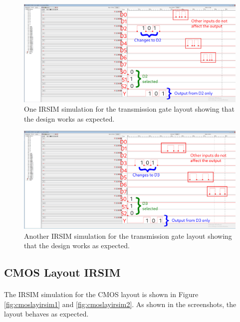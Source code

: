 \documentclass{article}
\begin{document}
    \begin{figure}[H]
      \centering
      \includegraphics[width=\linewidth, frame]{screenshots/tg/lay/irsim.png}
      \caption{One IRSIM simulation for the transmission gate layout showing that the design works as expected.}
      \label{fig:tglayirsim1}
    \end{figure}


    \begin{figure}[H]
      \centering
      \includegraphics[width=\linewidth, frame]{screenshots/tg/lay/irsim2.png}
      \caption{Another IRSIM simulation for the transmission gate layout showing that the design works as expected.}
      \label{fig:tglayirsim2}
    \end{figure}


  \subsection{CMOS Layout IRSIM}
    \paragraph{}
    The IRSIM simulation for the CMOS layout is shown in Figure \ref{fig:cmoslayirsim1} and \ref{fig:cmoslayirsim2}. As shown in the screenshots, the layout behaves as expected.
\end{document}

